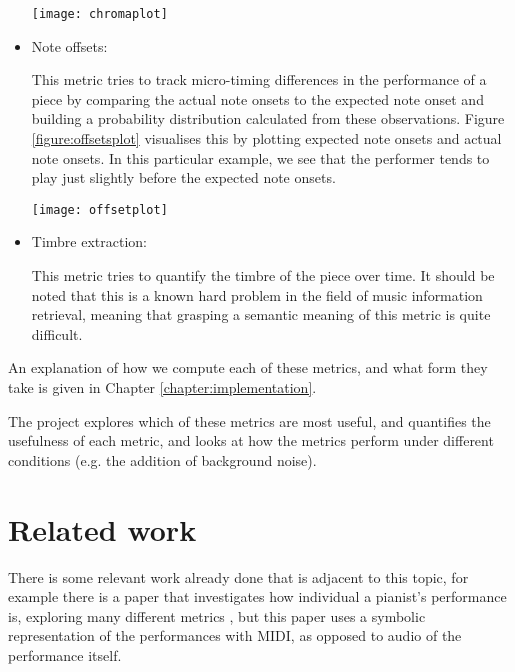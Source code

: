 \documentclass[oneside, class=book, crop=false, 12pt]{standalone}
\begin{document}
\begin{itemize}
    \begin{minipage}{\textwidth}
      \centering
      \texttt{[image: chromaplot]}
      \label{figure:chromaplot}
        
    \end{minipage}

  \item
    Note offsets:

    This metric tries to track micro-timing differences in the performance of a piece by comparing the actual note onsets to the expected note onset and building a probability distribution calculated from these observations. Figure \ref{figure:offsetsplot} visualises this by plotting expected note onsets and actual note onsets. In this particular example, we see that the performer tends to play just slightly before the expected note onsets.

\begin{minipage}{\textwidth}
  \centering
  \texttt{[image: offsetplot]}
  \label{figure:offsetsplot}
\end{minipage}



  \item
    Timbre extraction:

    This metric tries to quantify the timbre of the piece over time. It should be noted that this is a known hard problem in the field of music information retrieval, meaning that grasping a semantic meaning of this metric is quite difficult.
\end{itemize}





An explanation of how we compute each of these metrics, and what form they take is given in Chapter \ref{chapter:implementation}.

The project explores which of these metrics are most useful, and quantifies the usefulness of each metric, and looks at how the metrics perform under different conditions (e.g. the addition of background noise).


\section{Related work}

There is some relevant work already done that is adjacent to this topic, for example there is a paper that investigates how individual a pianist's performance is, exploring many different metrics \cite{bernays14}, but this paper uses a symbolic representation of the performances with MIDI, as opposed to audio of the performance itself.
\end{document}
